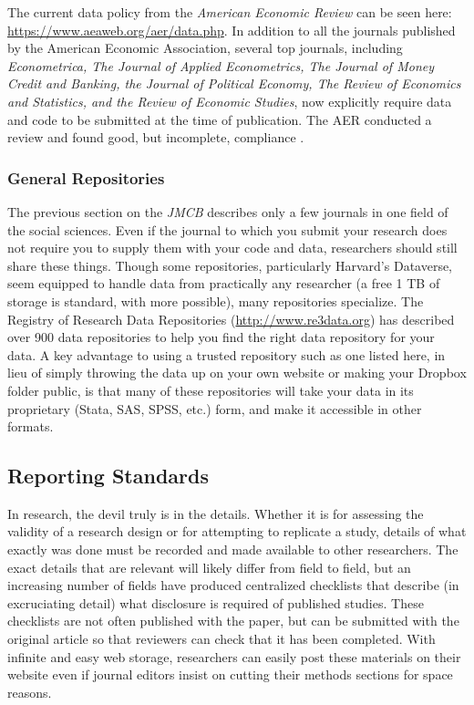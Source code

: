 \documentclass[12pt] {article}
\begin{document}
The current data policy from the \emph{American Economic Review} can be
seen here: \url{https://www.aeaweb.org/aer/data.php}. In addition to all
the journals published by the American Economic Association, several top
journals, including \emph{Econometrica, The Journal of Applied
Econometrics, The Journal of Money Credit and Banking, the Journal of
Political Economy, The Review of Economics and Statistics, and the
Review of Economic Studies}, now explicitly require data and code to be
submitted at the time of publication. The AER conducted a review and
found good, but incomplete, compliance \citep{glandon_report_2010}.

\subsubsection{General Repositories}\label{general-repositories}

The previous section on the \emph{JMCB} describes only a few journals in
one field of the social sciences. Even if the journal to which you
submit your research does not require you to supply them with your code
and data, researchers should still share these things. Though some
repositories, particularly Harvard's Dataverse, seem equipped to handle
data from practically any researcher (a free 1 TB of storage is
standard, with more possible), many repositories specialize. The
Registry of Research Data Repositories (\url{http://www.re3data.org})
has described over 900 data repositories to help you find the right data
repository for your data. A key advantage to using a trusted repository
such as one listed here, in lieu of simply throwing the data up on your
own website or making your Dropbox folder public, is that many of these
repositories will take your data in its proprietary (Stata, SAS, SPSS,
etc.) form, and make it accessible in other formats.

\subsection{Reporting Standards}\label{reporting-standards}
In research, the devil truly is in the details. Whether it is for assessing the validity of a research design or for
attempting to replicate a study, details of what exactly was done must be recorded and made available to other researchers.
The exact details that are relevant will likely differ from field to field, but an increasing number of fields have
produced centralized checklists that describe (in excruciating detail) what disclosure is required of published studies. These checklists are not often published with the paper, but can be submitted with the original article so that reviewers can check that it has been completed. With infinite and easy web storage, researchers can easily post these materials on their website even if journal editors insist on cutting their methods sections for space reasons. 
\end{document}
